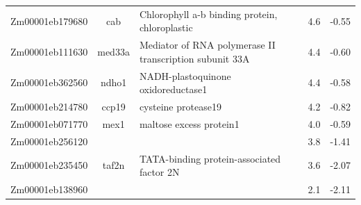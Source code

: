 \documentclass[9pt,twocolumn,twoside]{rilabRxiv}
\begin{document}
\begin{table}[h!]
\begin{tabular}{ccp{7.5cm}cc}
Zm00001eb179680 & cab & Chlorophyll a-b binding protein, chloroplastic & 4.6 & -0.55\\
Zm00001eb111630 & med33a & Mediator of RNA polymerase II transcription subunit 33A & 4.4 & -0.60\\
Zm00001eb362560 & ndho1 & NADH-plastoquinone oxidoreductase1 & 4.4 & -0.58\\
Zm00001eb214780 & ccp19 & cysteine protease19 & 4.2 & -0.82\\
Zm00001eb071770 & mex1 & maltose excess protein1 & 4.0 & -0.59\\
Zm00001eb256120 &  &  & 3.8 & -1.41\\
Zm00001eb235450 & taf2n & TATA-binding protein-associated factor 2N & 3.6 & -2.07\\
Zm00001eb138960 &  &  & 2.1 & -2.11\\
\hline
\end{tabular}
\end{table}

\clearpage
\end{document}

